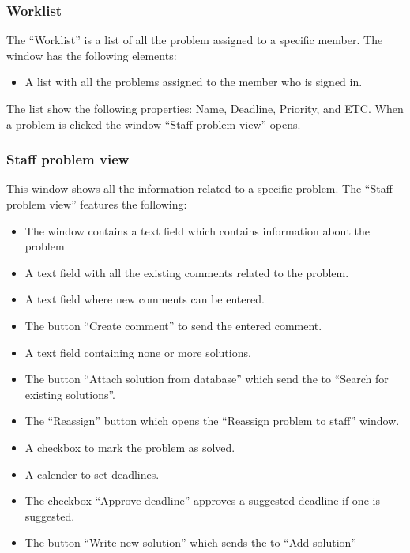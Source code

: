 

\subsubsection{Worklist}
The ``Worklist'' is a list of all the problem assigned to a specific \astaff member. The window has the following elements:
\begin{itemize}
	\item A list with all the problems assigned to the \astaff member who is signed in.
\end{itemize}
The list show the following properties: Name, Deadline, Priority, and ETC.
When a problem is clicked the window ``Staff problem view'' opens. 


\subsubsection{Staff problem view}
This window shows all the information related to a specific problem. 
The ``Staff problem view'' features the following:
\begin{itemize}
	\item The window contains a text field which contains information about the problem
	\item A text field with all the existing comments related to the problem.
	\item A text field where new comments can be entered.
	\item The button ``Create comment'' to send the entered comment.
	\item A text field containing none or more solutions.
	\item The button ``Attach solution from database'' which send the \astaff[] to ``Search for existing solutions''.  
	\item The ``Reassign'' button which opens the ``Reassign problem to staff'' window.
	\item A checkbox to mark the problem as solved.
	\item A calender to set deadlines.
	\item The checkbox ``Approve deadline'' approves a suggested deadline if one is suggested.
	\item The button ``Write new solution'' which sends the \astaff[] to ``Add solution''
\end{itemize}

